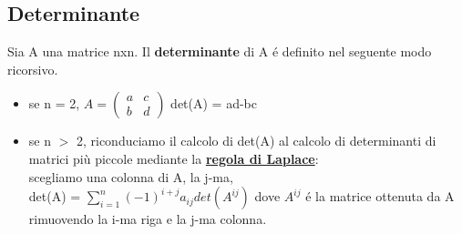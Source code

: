 \documentclass[12pt]{article}
\begin{document}
\subsection{Determinante}
Sia A una matrice nxn. Il \textbf{determinante} di A é definito nel seguente modo ricorsivo.
\begin{itemize}
    \item se n = 2, $A = \begin{pmatrix}
        a & c\\
        b & d
    \end{pmatrix}
    $
    det(A) = ad-bc
    \item se n $>$ 2, riconduciamo il calcolo di det(A) al calcolo di determinanti di matrici più piccole mediante la \underline{\textbf{regola di Laplace}}:\\
    scegliamo una colonna di A, la j-ma,\\
    det(A) = $\displaystyle\sum_{i = 1}^{n} (-1)^{i+j} a_{ij} det(A^{ij})$ dove $A^{ij}$ é la matrice ottenuta da A rimuovendo la i-ma riga e la j-ma colonna.\\
\end{itemize}
\end{document}
